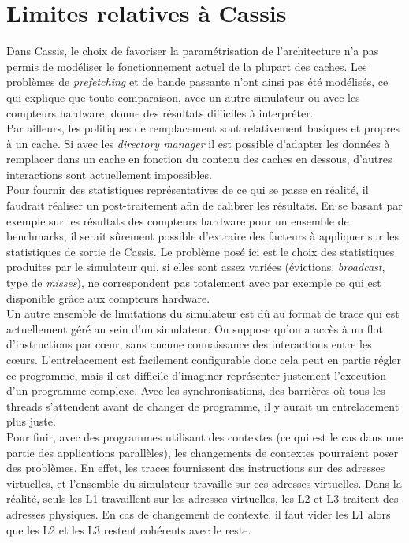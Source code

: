 \section{Limites relatives à \textsf{Cassis}}

Dans \textsf{Cassis}, le choix de favoriser la paramétrisation de l'architecture n'a pas permis de modéliser le fonctionnement actuel de la plupart des caches. Les problèmes de \emph{prefetching} et de bande passante n'ont ainsi pas été modélisés, ce qui explique que toute comparaison, avec un autre simulateur ou avec les compteurs hardware, donne des résultats difficiles à interpréter. \\

Par ailleurs, les politiques de remplacement sont relativement basiques et propres à un cache. Si avec les \emph{directory manager} il est possible d'adapter les données à remplacer dans un cache en fonction du contenu des caches en dessous, d'autres interactions sont actuellement impossibles. \\

Pour fournir des statistiques représentatives de ce qui se passe en réalité, il faudrait réaliser un post-traitement afin de calibrer les résultats. En se basant par exemple sur les résultats des compteurs hardware pour un ensemble de benchmarks, il serait sûrement possible d'extraire des facteurs à appliquer sur les statistiques de sortie de \textsf{Cassis}. Le problème posé ici est le choix des statistiques produites par le simulateur qui, si elles sont assez variées (évictions, \emph{broadcast}, type de \emph{misses}), ne correspondent pas totalement avec par exemple ce qui est disponible grâce aux compteurs hardware. \\

Un autre ensemble de limitations du simulateur est dû au format de trace qui est actuellement géré au sein d'un simulateur. On suppose qu'on a accès à un flot d'instructions par c{\oe}ur, sans aucune connaissance des interactions entre les c{\oe}urs. L'entrelacement est facilement configurable donc cela peut en partie régler ce programme, mais il est difficile d'imaginer représenter justement l'execution d'un programme complexe. Avec les synchronisations, des barrières où tous les threads s'attendent avant de changer de programme, il y aurait un entrelacement plus juste. \\

Pour finir, avec des programmes utilisant des contextes (ce qui est le cas dans une partie des applications parallèles), les changements de contextes pourraient poser des problèmes. En effet, les traces fournissent des instructions sur des adresses virtuelles, et l'ensemble du simulateur travaille sur ces adresses virtuelles. Dans la réalité, seuls les L1 travaillent sur les adresses virtuelles, les L2 et L3 traitent des adresses physiques. En cas de changement de contexte, il faut vider les L1 alors que les L2 et les L3 restent cohérents avec le reste.

